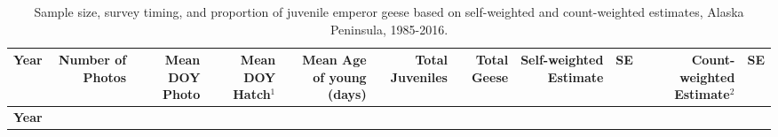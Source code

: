\documentclass[]{article}
\begin{document}
\setlength{\parindent}{0in} \setlength{\leftskip}{0in}
\setlength{\parskip}{0pt} \noindent
\newpage

\begin{longtable}[]{@{}rrrrrrrrrrr@{}}
\caption{Sample size, survey timing, and proportion of juvenile
emperor geese based on self-weighted and count-weighted estimates, Alaska Peninsula,
1985-2016.}\tabularnewline
\toprule
\begin{minipage}[b]{0.06\columnwidth}\raggedleft\strut
\textbf{Year}\strut
\end{minipage} & \begin{minipage}[b]{0.07\columnwidth}\raggedleft\strut
\textbf{Number of Photos}\strut
\end{minipage} & \begin{minipage}[b]{0.07\columnwidth}\raggedleft\strut
\textbf{Mean DOY Photo}\strut
\end{minipage} & \begin{minipage}[b]{0.07\columnwidth}\raggedleft\strut
\textbf{Mean DOY Hatch$^1$}\strut
\end{minipage} & \begin{minipage}[b]{0.07\columnwidth}\raggedleft\strut
\textbf{Mean Age of young (days)}\strut
\end{minipage} & \begin{minipage}[b]{0.07\columnwidth}\raggedleft\strut
\textbf{Total Juveniles}\strut
\end{minipage} & \begin{minipage}[b]{0.05\columnwidth}\raggedleft\strut
\textbf{Total Geese}\strut
\end{minipage} & \begin{minipage}[b]{0.09\columnwidth}\raggedleft\strut
\textbf{Self-weighted Estimate}\strut
\end{minipage} & \begin{minipage}[b]{0.05\columnwidth}\raggedleft\strut
\textbf{SE}\strut
\end{minipage} & \begin{minipage}[b]{0.10\columnwidth}\raggedleft\strut
\textbf{Count-weighted Estimate$^2$}\strut
\end{minipage} & \begin{minipage}[b]{0.04\columnwidth}\raggedleft\strut
\textbf{SE}\strut
\end{minipage}\tabularnewline
\midrule
\endfirsthead
\toprule
\begin{minipage}[b]{0.06\columnwidth}\raggedleft\strut
\textbf{Year}\strut
\end{minipage} & \begin{minipage}[b]{0.07\columnwidth}\raggedleft\strut

\end{minipage}
\end{longtable}
\end{document}

